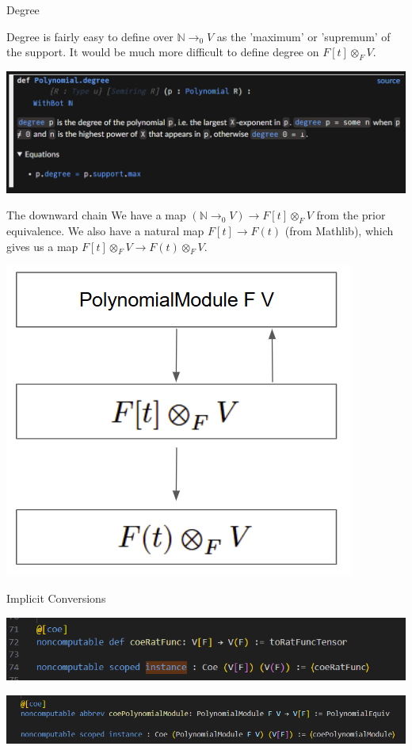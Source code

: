 \documentclass[svgnames]{beamer}
\begin{document}
\begin{frame}{Degree}

Degree is fairly easy to define over $\mathbb N \to_0 V$ as the 'maximum' or 'supremum' of the support. It would be much more difficult to define degree on $F[t] \otimes_F V$. 

\pause \includegraphics[width=1\linewidth]{image5.png}

\end{frame}
\begin{frame}{The downward chain}
We have a map $(\mathbb N \to_0 V) \to F[t] \otimes_F V$ from the prior equivalence. We also have a natural map $F[t] \to F(t)$ (from Mathlib), which gives us a map $F[t] \otimes_F V \to F(t) \otimes_F V$. 

\centering

\pause \includegraphics[width=0.5\linewidth]{image11.png}


\end{frame}

\begin{frame}{Implicit Conversions}



\includegraphics[width=1\linewidth]{image7.png}


\includegraphics[width=1\linewidth]{image8.png}


\end{frame}
\end{document}
